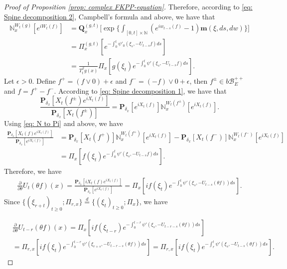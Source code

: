 \documentclass[12pt]{amsart}
\theoremstyle{plain}
\theoremstyle{definition}
\numberwithin{equation}{section}
\begin{document}
\begin{proof}[Proof of Proposition \ref{prop: complex FKPP-equation}]
    Therefore, according to \eqref{eq: Spine decomposition 2}, Campbell's formula and above, we have that
\begin{align}
\label{eq: N to Pi}
    \mathbb N_x^{W_t(g)}[e^{i W_t(f)}]
    &=\mathbf Q_x^{(g,t)} \Big[\exp\Big\{\int_{[0,t]\times \mathbb N}(e^{i w_{t-s}(f)} - 1) \mathbf m(\xi, ds,dw)\Big\}\Big]
    \\&= \Pi_x^{(g,t)} [e^{-\int_0^t \psi'_0(\xi_s, -U_{t-s}f)ds}]
    \\&= \frac{1}{T_t^\beta g (x)} \Pi_x[ g(\xi_t) e^{-\int_0^t \psi'(\xi_s, -U_{t-s}f)ds} ].
\end{align}
    Let $\epsilon >0$.
    Define $f^+ = (f \vee 0) + \epsilon$ and $f^- = (-f) \vee 0 + \epsilon$, then $f^\pm \in b\mathscr B^{++}_E$ and $f = f^+ - f^-$.
    According to \eqref{eq: Spine decomposition 1}, we have that
\begin{equation}
    \frac{\mathbf P_{\delta_x}[X_t(f^{\pm})e^{i X_t(f)}]}{\mathbf P_{\delta_x}[X_t(f^{\pm})]}
    = \mathbf P_{\delta_x}[e^{i X_t(f)}] \mathbb N_x^{W_t(f^{\pm})}[e^{i X_t(f)}].
\end{equation}
    Using \eqref{eq: N to Pi} and above, we have
\begin{align}
    \frac{\mathbf P_{\delta_x}[X_t(f)e^{i X_t(f)}] }{\mathbf P_{\delta_x}[e^{i X_t(f)}]}
    &= \mathbf P_{\delta_x}[X_t(f^+)] \mathbb N_x^{W_t(f^+)} [e^{i X_t(f)}] - \mathbf P_{\delta_x}[X_t(f^-)]\mathbb N_x^{W_t(f^-)}[e^{i X_t(f)}]
    \\& = \Pi_x[ f(\xi_t) e^{- \int_0^t \psi'(\xi_s, -U_{t-s}f) ds}  ].
\end{align}
    Therefore, we have
\begin{align}
    \frac{\partial}{\partial \theta} {U_t(\theta f)(x)}
    = \frac{\mathbf P_{\delta_x}[iX_t(f)e^{i X_t(f)}] }{\mathbf P_{\delta_x}[e^{i X_t(f)}]}
    =  \Pi_x[ if(\xi_t) e^{ - \int_0^t \psi'(\xi_s, -U_{t-s}(\theta f)) ds} ].
\end{align}
    Since $\{(\xi_{r+t})_{t \geq 0}; \Pi_{r,x}\} \overset{d}{=} \{(\xi_{t})_{t\geq 0}; \Pi_{x}\} $, we have

\begin{align}
    &\frac{\partial}{\partial \theta} U_{t-r}(\theta f)( x)
    = \Pi_x[ i f(\xi_{t-r}) e^{-\int_0^{t-r} \psi'(\xi_s, -U_{t-r-s}(\theta f)) ds} ]
    \\&= \Pi_{r,x}[i f(\xi_t)e^{-\int_0^{t-r} \psi'(\xi_{r+s}, -U_{t-r-s}(\theta f)) ds} ]
    = \Pi_{r,x}[if(\xi_t)e^{-\int_r^t \psi'(\xi_{s}, -U_{t-s}(\theta f)) ds} ].
\end{align}


\end{proof}
\end{document}
